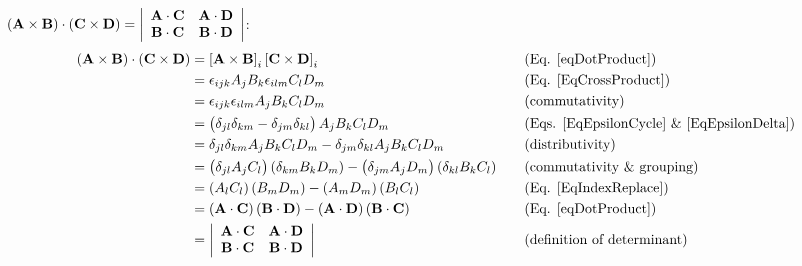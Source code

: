  
$\left(\mathbf{ A}\times\mathbf{ B}\right)\cdot\left(\mathbf{ C}\times\mathbf{ D}
\right)=\begin{vmatrix}\begin{array}{cc}
\mathbf{ A}\cdot\mathbf{ C} & \mathbf{ A}\cdot\mathbf{ D}\\
\mathbf{ B}\cdot\mathbf{ C} & \mathbf{ B}\cdot\mathbf{ D}
\end{array}\end{vmatrix}$:
\begin{equation}
\begin{aligned}\left(\mathbf{ A}\times\mathbf{ B}\right)\cdot\left(\mathbf{ C}
\times\mathbf{ D}\right) & 
=\left[\mathbf{ A}\times\mathbf{ B}\right]_{i}\left[\mathbf{ C}\times\mathbf{ D}
\right]_{i} & \,\,\,\,\,\, & \text{(Eq. \ref{eqDotProduct})}\\
 & =\epsilon_{ijk}A_{j}B_{k}\epsilon_{ilm}C_{l}D_{m} &  & \text{(Eq. 
\ref{EqCrossProduct})}\\
 & =\epsilon_{ijk}\epsilon_{ilm}A_{j}B_{k}C_{l}D_{m} &  & 
\text{(commutativity)}\\
 & 
=\left(\delta_{jl}\delta_{km}-\delta_{jm}\delta_{kl}\right)A_{j}B_{k}C_{l}D_{m} 
&  & \text{(Eqs. \ref{EqEpsilonCycle} \& \ref{EqEpsilonDelta})}\\
 & 
=\delta_{jl}\delta_{km}A_{j}B_{k}C_{l}D_{m}-\delta_{jm}\delta_{kl}A_{j}B_{k}C_{l
}D_{m} &  & \text{(distributivity)}\\
 & 
=\left(\delta_{jl}A_{j}C_{l}\right)\left(\delta_{km}B_{k}D_{m}
\right)-\left(\delta_{jm}A_{j}D_{m}\right)\left(\delta_{kl}B_{k}C_{l}\right) &  
& \text{(commutativity \& grouping)}\\
 & 
=\left(A_{l}C_{l}\right)\left(B_{m}D_{m}\right)-\left(A_{m}D_{m}\right)\left(B_{
l}C_{l}\right) &  & \text{(Eq. \ref{EqIndexReplace})}\\
 & 
=\left(\mathbf{ A}\cdot\mathbf{ C}\right)\left(\mathbf{ B}\cdot\mathbf{ D}
\right)-\left(\mathbf{ A}\cdot\mathbf{ D}\right)\left(\mathbf{ B}\cdot\mathbf{ C}
\right) &  & \text{(Eq. \ref{eqDotProduct})}\\
 & =\begin{vmatrix}\begin{array}{cc}
\mathbf{ A}\cdot\mathbf{ C} & \mathbf{ A}\cdot\mathbf{ D}\\
\mathbf{ B}\cdot\mathbf{ C} & \mathbf{ B}\cdot\mathbf{ D}
\end{array}\end{vmatrix} &  & \text{(definition of determinant)}
\end{aligned}
\end{equation}


